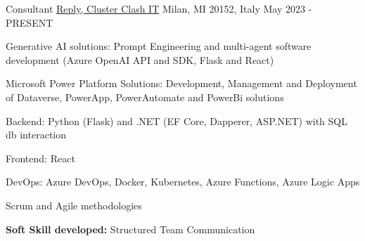 

\begin{cventries}

  \cventry
    {Consultant} %
    {\href{www.reply.com/}{Reply, Cluster Clash IT}} %
    {Milan, MI 20152, Italy} %
    {May 2023 - PRESENT} %
    {
       \begin{cvitems} %
        \item {Generative AI solutions: Prompt Engineering and multi-agent software development (Azure OpenAI API and SDK, Flask and React)}
        \item {Microsoft Power Platform Solutions: Development, Management and Deployment of Dataverse, PowerApp, PowerAutomate and PowerBi solutions}
        \item {Backend: Python (Flask) and .NET (EF Core, Dapperer, ASP.NET) with SQL db interaction}
        \item {Frontend: React}
        \item {DevOps: Azure DevOps, Docker, Kubernetes, Azure Functions, Azure Logic Apps}
        \item {Scrum and Agile methodologies}
        \item {\textbf{Soft Skill developed:} Structured Team Communication}
       \end{cvitems}
    }


\end{cventries}
